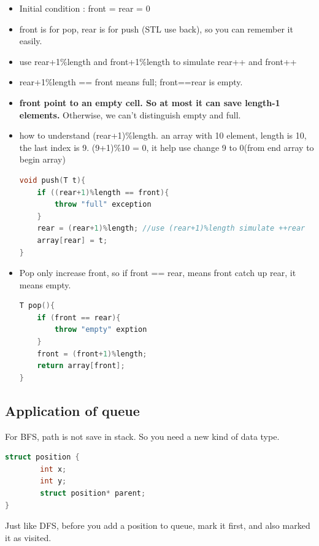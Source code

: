 \documentclass[a4paper,11pt,twoside]{book}
\begin{document}
\begin{itemize}
\item Initial condition : front = rear = 0

\item front is for pop, rear is for push (STL use back), so you can remember it easily.

\item use rear+1\%length and front+1\%length to simulate rear++ and front++

\item rear+1\%length == front means full;  front==rear is empty.

\item \textbf{front point to an empty cell. So at most it can save length-1 elements. } Otherwise, we can't distinguish empty and full.


\item how to understand (rear+1)\%length. an array with 10 element, length is 10, the last index is 9.  (9+1)\%10 = 0, it help use change 9 to 0(from end array to begin array)

\begin{lstlisting}[frame=single, language=c++]
void push(T t){
	if ((rear+1)%length == front){
		throw "full" exception
	}
	rear = (rear+1)%length; //use (rear+1)%length simulate ++rear
	array[rear] = t;
}	
\end{lstlisting}

\item Pop only increase front, so if front == rear, means front catch up rear, it means empty.
\begin{lstlisting}[frame=single, language=c++]
T pop(){
	if (front == rear){
		throw "empty" exption
	}
	front = (front+1)%length;
	return array[front];
}
\end{lstlisting}

\end{itemize}




\subsection{Application of queue}

\par For BFS, path is not save in stack. So you need a new kind of data type. 
\begin{lstlisting}[frame=single, language=c++]
struct position {
        int x;
        int y;
        struct position* parent;
}
\end{lstlisting}
\par Just like DFS, before you add a position to queue, mark it first, and also marked it as visited. 
\end{document}
